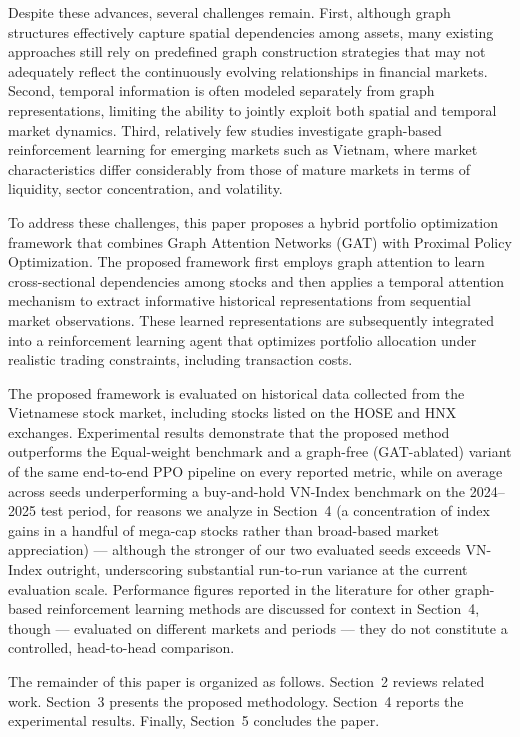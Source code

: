 \documentclass[runningheads]{llncs}
\begin{document}
Despite these advances, several challenges remain. First, although graph structures effectively capture spatial dependencies among assets, many existing approaches still rely on predefined graph construction strategies that may not adequately reflect the continuously evolving relationships in financial markets. Second, temporal information is often modeled separately from graph representations, limiting the ability to jointly exploit both spatial and temporal market dynamics. Third, relatively few studies investigate graph-based reinforcement learning for emerging markets such as Vietnam, where market characteristics differ considerably from those of mature markets in terms of liquidity, sector concentration, and volatility.

To address these challenges, this paper proposes a hybrid portfolio optimization framework that combines Graph Attention Networks (GAT) with Proximal Policy Optimization. The proposed framework first employs graph attention to learn cross-sectional dependencies among stocks and then applies a temporal attention mechanism to extract informative historical representations from sequential market observations. These learned representations are subsequently integrated into a reinforcement learning agent that optimizes portfolio allocation under realistic trading constraints, including transaction costs.

The proposed framework is evaluated on historical data collected from the Vietnamese stock market, including stocks listed on the HOSE and HNX exchanges. Experimental results demonstrate that the proposed method outperforms the Equal-weight benchmark and a graph-free (GAT-ablated) variant of the same end-to-end PPO pipeline on every reported metric, while on average across seeds underperforming a buy-and-hold VN-Index benchmark on the 2024--2025 test period, for reasons we analyze in Section~4 (a concentration of index gains in a handful of mega-cap stocks rather than broad-based market appreciation) --- although the stronger of our two evaluated seeds exceeds VN-Index outright, underscoring substantial run-to-run variance at the current evaluation scale. Performance figures reported in the literature for other graph-based reinforcement learning methods are discussed for context in Section~4, though --- evaluated on different markets and periods --- they do not constitute a controlled, head-to-head comparison.

The remainder of this paper is organized as follows. Section~2 reviews related work. Section~3 presents the proposed methodology. Section~4 reports the experimental results. Finally, Section~5 concludes the paper.
\end{document}
